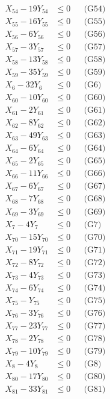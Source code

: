 \documentclass[a4paper,10pt]{article}
\begin{document}
{\begin{align}
X_{54} - 19Y_{54} &\leq 0 && \text{(G54)} \\
X_{55} - 16Y_{55} &\leq 0 && \text{(G55)} \\
X_{56} - 6Y_{56} &\leq 0 && \text{(G56)} \\
X_{57} - 3Y_{57} &\leq 0 && \text{(G57)} \\
X_{58} - 13Y_{58} &\leq 0 && \text{(G58)} \\
X_{59} - 35Y_{59} &\leq 0 && \text{(G59)} \\
X_{6} - 32Y_{6} &\leq 0 && \text{(G6)} \\
X_{60} - 10Y_{60} &\leq 0 && \text{(G60)} \\
X_{61} - 2Y_{61} &\leq 0 && \text{(G61)} \\
X_{62} - 8Y_{62} &\leq 0 && \text{(G62)} \\
X_{63} - 49Y_{63} &\leq 0 && \text{(G63)} \\
X_{64} - 6Y_{64} &\leq 0 && \text{(G64)} \\
\allowbreak
X_{65} - 2Y_{65} &\leq 0 && \text{(G65)} \\
X_{66} - 11Y_{66} &\leq 0 && \text{(G66)} \\
X_{67} - 6Y_{67} &\leq 0 && \text{(G67)} \\
X_{68} - 7Y_{68} &\leq 0 && \text{(G68)} \\
X_{69} - 3Y_{69} &\leq 0 && \text{(G69)} \\
X_{7} - 4Y_{7} &\leq 0 && \text{(G7)} \\
X_{70} - 15Y_{70} &\leq 0 && \text{(G70)} \\
X_{71} - 19Y_{71} &\leq 0 && \text{(G71)} \\
X_{72} - 8Y_{72} &\leq 0 && \text{(G72)} \\
X_{73} - 4Y_{73} &\leq 0 && \text{(G73)} \\
X_{74} - 6Y_{74} &\leq 0 && \text{(G74)} \\
X_{75} - Y_{75} &\leq 0 && \text{(G75)} \\
X_{76} - 3Y_{76} &\leq 0 && \text{(G76)} \\
X_{77} - 23Y_{77} &\leq 0 && \text{(G77)} \\
X_{78} - 2Y_{78} &\leq 0 && \text{(G78)} \\
X_{79} - 10Y_{79} &\leq 0 && \text{(G79)} \\
X_{8} - 4Y_{8} &\leq 0 && \text{(G8)} \\
X_{80} - 17Y_{80} &\leq 0 && \text{(G80)} \\
X_{81} - 33Y_{81} &\leq 0 && \text{(G81)} \\

\end{align}}
\end{document}
